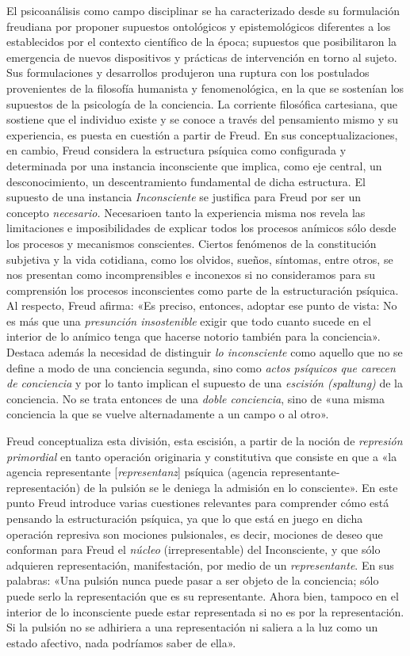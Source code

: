 El psicoanálisis como campo disciplinar se ha caracterizado desde su formulación freudiana por proponer supuestos ontológicos y epistemológicos diferentes a los establecidos por el contexto científico de la época; supuestos que posibilitaron la emergencia de nuevos dispositivos y prácticas de intervención en torno al sujeto. Sus formulaciones y desarrollos produjeron una ruptura con los postulados provenientes de la filosofía humanista y fenomenológica, en la que se sostenían los supuestos de la psicología de la conciencia. La corriente filosófica cartesiana, que sostiene que el individuo existe y se conoce a través del pensamiento mismo y su experiencia, es puesta en cuestión a partir de Freud. En sus conceptualizaciones, en cambio, Freud considera la estructura psíquica como configurada y determinada por una instancia inconsciente que implica, como eje central, un desconocimiento, un descentramiento fundamental de dicha estructura. El supuesto de una instancia \emph{Inconsciente} se justifica para Freud por ser un concepto \emph{necesario. }Necesarioen tanto la experiencia misma nos revela las limitaciones e imposibilidades de explicar todos los procesos anímicos sólo desde los procesos y mecanismos conscientes. Ciertos fenómenos de la constitución subjetiva y la vida cotidiana, como los olvidos, sueños, síntomas, entre otros, se nos presentan como incomprensibles e inconexos si no consideramos para su comprensión los procesos inconscientes como parte de la estructuración psíquica. Al respecto, Freud afirma: «Es preciso, entonces, adoptar ese punto de vista: No es más que una \emph{presunción insostenible} exigir que todo cuanto sucede en el interior de lo anímico tenga que hacerse notorio también para la conciencia». Destaca además la necesidad de distinguir \emph{lo inconsciente }como aquello que no se define a modo de una conciencia segunda, sino como \emph{actos psíquicos que carecen de conciencia }y por lo tanto implican el supuesto de una \emph{escisión (spaltung) }de la conciencia. No se trata entonces de una \emph{doble conciencia}, sino de «una misma conciencia la que se vuelve alternadamente a un campo o al otro».

Freud conceptualiza esta división, esta escisión, a partir de la noción de \emph{represión primordial} en tanto operación originaria y constitutiva que consiste en que a «la agencia representante {[}\emph{representanz}{]} psíquica (agencia representante-representación) de la pulsión se le deniega la admisión en lo consciente». En este punto Freud introduce varias cuestiones relevantes para comprender cómo está pensando la estructuración psíquica, ya que lo que está en juego en dicha operación represiva son mociones pulsionales, es decir, mociones de deseo que conforman para Freud el \emph{núcleo} (irrepresentable) del Inconsciente, y que sólo adquieren representación, manifestación, por medio de un \emph{representante}. En sus palabras: «Una pulsión nunca puede pasar a ser objeto de la conciencia; sólo puede serlo la representación que es su representante. Ahora bien, tampoco en el interior de lo inconsciente puede estar representada si no es por la representación. Si la pulsión no se adhiriera a una representación ni saliera a la luz como un estado afectivo, nada podríamos saber de ella».

